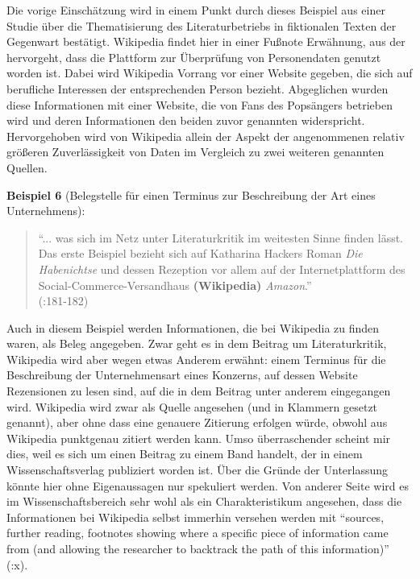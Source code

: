 \documentclass[fontsize=12pt]{scrartcl}
\begin{document}
Die vorige Einsch\"atzung wird in einem Punkt durch dieses Beispiel aus einer Studie \"uber die Thematisierung des Li\-te\-ra\-tur\-betriebs in fiktionalen Texten der Gegenwart best\"atigt. Wi\-ki\-pe\-dia findet \mbox{hier} in einer Fu{\ss}note Erw\"ahnung, aus der hervorgeht, dass die Plattform zur \"Uberpr\"ufung von Per\-so\-nendaten genutzt worden ist. Dabei wird Wi\-ki\-pe\-dia Vorrang vor einer Website gegeben, die sich auf berufliche Inte\-ressen der entsprechenden Person bezieht. Abgeglichen wurden diese Informationen mit einer Website, die von Fans des Pops\"angers betrieben wird und deren Informationen den beiden zuvor genannten widerspricht. Hervorgehoben wird von Wi\-ki\-pe\-dia allein der Aspekt der angenommenen relativ gr\"o{\ss}eren Zuverl\"assigkeit von Daten im Vergleich zu zwei weiteren genannten Quellen.

\textbf{Beispiel 6} (Belegstelle f\"ur einen Terminus zur Beschreibung der Art eines Unternehmens):
\singlespacing
\begin{quote}
"`... was sich im Netz unter Li\-te\-ra\-tur\-kritik im weitesten Sinne finden l\"asst. Das erste Beispiel bezieht sich auf Katharina Hackers Roman \textit{Die Habenichtse} und dessen Rezeption vor allem auf der Internetplattform des \flq Social-Commerce-Versandhaus\frq \,\,\textbf{(Wi\-ki\-pe\-dia)} \textit{Amazon}."'\\ (\cite{Wegmann2012}:181-182)
\end{quote}
\onehalfspacing

Auch in diesem Beispiel werden Informationen, die bei Wi\-ki\-pe\-dia zu finden waren, als Beleg angegeben. Zwar geht es in dem Beitrag um Li\-te\-ra\-tur\-kritik, Wi\-ki\-pe\-dia wird aber wegen etwas Anderem erw\"ahnt: einem Terminus f\"ur die Beschreibung der Unternehmensart eines Konzerns, auf dessen Website Rezensionen zu lesen sind, auf die in dem Beitrag unter anderem eingegangen wird. Wi\-ki\-pe\-dia wird zwar als Quelle angesehen (und in Klammern gesetzt genannt), aber ohne dass eine genauere Zitierung erfolgen w\"urde, obwohl aus Wi\-ki\-pe\-dia punktgenau zitiert werden kann. Umso \"uberraschender scheint mir dies, weil es sich um einen Beitrag zu einem Band handelt, der in einem Wissenschaftsverlag pu\-bli\-ziert worden ist. \"Uber die Gr\"unde der Unterlassung k\"onnte \mbox{hier} ohne Eigenaussagen nur spekuliert werden. Von an\-de\-rer Seite wird es im Wissenschaftsbereich sehr wohl als ein Charakteristikum angesehen, dass die Informationen bei Wi\-ki\-pe\-dia \mbox{selbst} immerhin versehen werden mit "`sources, further reading, footnotes showing where a specific piece of information came from (and allowing the researcher to backtrack the path of this \flq information\frq)"' (\cite{Hotz-Daviesetal2009}:x).
\end{document}
